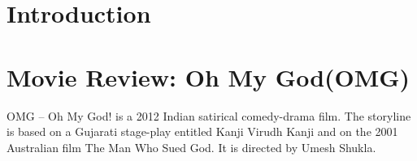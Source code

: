 \documentclass{article}
\begin{document}
\section{Introduction}
\section{Movie Review: Oh My God(OMG)}
OMG – Oh My God! is a 2012 Indian satirical comedy-drama film. The storyline is based on a Gujarati stage-play entitled Kanji Virudh Kanji and on the 2001 Australian film The Man Who Sued God. It is directed by Umesh Shukla.
\end{document}
